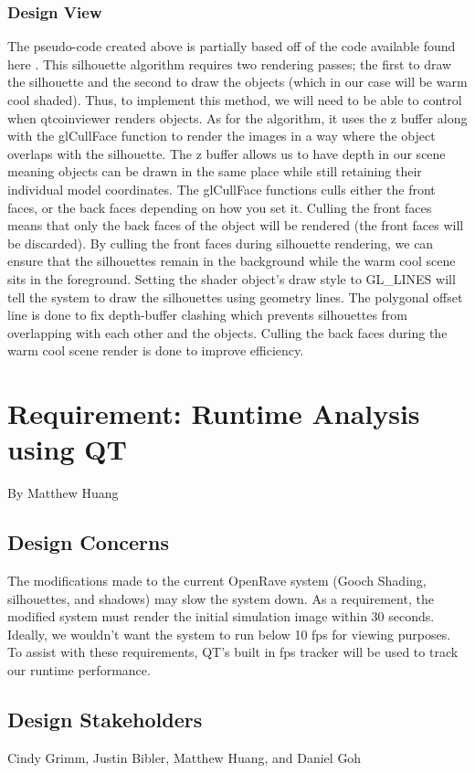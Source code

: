 \documentclass[10pt,journal,compsoc,draftclsnofoot]{IEEEtran}
\begin{document}
\begin{flushleft}
\subsubsection{Design View}
The pseudo-code created above is partially based off of the code available found here \cite{siledges}.
This silhouette algorithm requires two rendering passes; the first to draw the silhouette and the second to draw the objects (which in our case will be warm cool shaded).
Thus, to implement this method, we will need to be able to control when qtcoinviewer renders objects.
As for the algorithm, it uses the z buffer along with the glCullFace function to render the images in a way where the object overlaps with the silhouette.
The z buffer allows us to have depth in our scene meaning objects can be drawn in the same place while still retaining their individual model coordinates.
The glCullFace functions culls either the front faces, or the back faces depending on how you set it.
Culling the front faces means that only the back faces of the object will be rendered (the front faces will be discarded).
By culling the front faces during silhouette rendering, we can ensure that the silhouettes remain in the background while the warm cool scene sits in the foreground.
Setting the shader object's draw style to GL\_LINES will tell the system to draw the silhouettes using geometry lines.
The polygonal offset line is done to fix depth-buffer clashing which prevents silhouettes from overlapping with each other and the objects.
Culling the back faces during the warm cool scene render is done to improve efficiency.
\newpage

\section{Requirement: Runtime Analysis using QT}
\large{By Matthew Huang}

\normalsize
\subsection{Design Concerns}
The modifications made to the current OpenRave system (Gooch Shading, silhouettes, and shadows) may slow the system down.
As a requirement, the modified system must render the initial simulation image within 30 seconds.
Ideally, we wouldn't want the system to run below 10 fps for viewing purposes.
To assist with these requirements, QT's built in fps tracker will be used to track our runtime performance.

\subsection{Design Stakeholders}
Cindy Grimm, Justin Bibler, Matthew Huang, and Daniel Goh


\end{flushleft}
\end{document}
